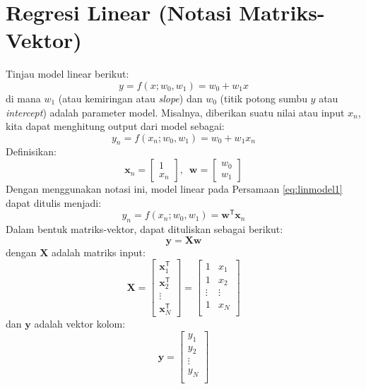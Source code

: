 \section{Regresi Linear (Notasi Matriks-Vektor)}

Tinjau model linear berikut:
\begin{equation}
y = f(x; w_{0}, w_{1}) = w_{0} + w_{1}x
\end{equation}
di mana $w_{1}$ (atau kemiringan atau \textit{slope}) dan $w_{0}$
(titik potong sumbu $y$ atau \textit{intercept}) adalah parameter model.
Misalnya, diberikan suatu nilai atau input $x_{n}$, kita dapat menghitung output dari model
sebagai:
\begin{equation}
y_{n} = f(x_{n}; w_{0}, w_{1}) = w_{0} + w_{1}x_{n}
\label{eq:linmodel1}
\end{equation}
Definisikan:
\begin{equation}
\mathbf{x}_{n} = \begin{bmatrix}
1 \\
x_{n}
\end{bmatrix}
,\,\,\,%
\mathbf{w} = \begin{bmatrix}
w_{0} \\
w_{1}
\end{bmatrix}
\end{equation}
Dengan menggunakan notasi ini, model linear pada Persamaan \eqref{eq:linmodel1} dapat ditulis
menjadi:
\begin{equation}
y_{n} = f(x_{n}; w_0, w_1) = \mathbf{w}^{\mathsf{T}} \mathbf{x}_{n}
\label{eq:linmodel2}
\end{equation}
Dalam bentuk matriks-vektor, dapat dituliskan sebagai berikut:
\begin{equation}
\mathbf{y} = \mathbf{X}\mathbf{w}
\end{equation}
dengan $\mathbf{X}$ adalah matriks input:
\begin{equation}
\mathbf{X} = \begin{bmatrix}
\mathbf{x}^{\mathsf{T}}_{1} \\
\mathbf{x}^{\mathsf{T}}_{2} \\
\vdots \\
\mathbf{x}^{\mathsf{T}}_{N}
\end{bmatrix} =
\begin{bmatrix}
1 & x_{1} \\
1 & x_{2} \\
\vdots & \vdots \\
1 & x_{N} \\
\end{bmatrix}
\end{equation}
dan $\mathbf{y}$ adalah vektor kolom:
\begin{equation}
\mathbf{y} =
\begin{bmatrix}
y_{1} \\
y_{2} \\
\vdots \\
y_{N} \\
\end{bmatrix}
\end{equation}

